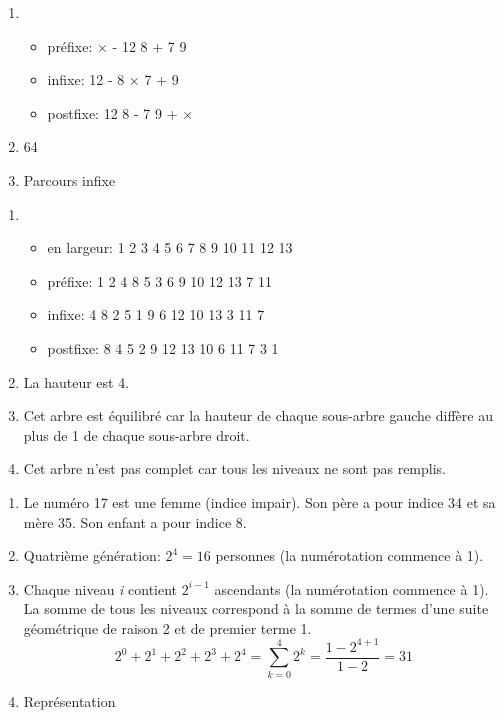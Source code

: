 \documentclass[a4paper,11pt]{article}
\begin{document}
\begin{Form}
\begin{exo}
\begin{enumerate}
\item \begin{itemize}
\item préfixe: × - 12 8 + 7 9
\item infixe: 12 - 8 × 7 + 9
\item postfixe: 12 8 - 7 9 + ×
\end{itemize}
\item 64
\item Parcours infixe
\end{enumerate}
\end{exo}
\begin{exo}
\begin{enumerate}
\item 
\begin{itemize}
\item en largeur: 1 2 3 4 5 6 7 8 9 10 11 12 13
\item préfixe: 1 2 4 8 5 3 6 9 10 12 13 7 11
\item infixe: 4 8 2 5 1 9 6 12 10 13 3 11 7
\item postfixe: 8 4 5 2 9 12 13 10 6 11 7 3 1
\end{itemize}
\item La hauteur est 4.
\item Cet arbre est équilibré car la hauteur de chaque sous-arbre gauche diffère au plus de 1 de chaque sous-arbre droit.
\item Cet arbre n'est pas complet car tous les niveaux ne sont pas remplis.
\end{enumerate}
\end{exo}
\begin{exo}
\begin{enumerate}
\item Le numéro 17 est une femme (indice impair). Son père a pour indice 34 et sa mère 35. Son enfant a pour indice 8.
\item Quatrième génération: $2^4 = 16$ personnes (la numérotation commence à 1).
\item Chaque niveau \emph{i} contient $2^{i-1}$ ascendants (la numérotation commence à 1). La somme de tous les niveaux correspond à la somme de termes d'une suite géométrique de raison 2 et de premier terme 1. $$2^0+2^1+2^2+2^3+2^4=\sum_{k=0}^{4}{2^k}=\dfrac{1-2^{4+1}}{1-2}=31$$
\item Représentation\\

\end{enumerate}
\end{exo}
\end{Form}
\end{document}
